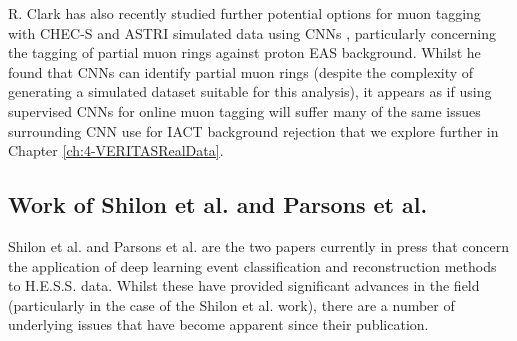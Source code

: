 R. Clark has also recently studied further potential options for muon tagging with CHEC-S and ASTRI simulated data using CNNs \cite{roganthesis}, particularly concerning the tagging of partial muon rings against proton EAS background. Whilst he found that CNNs can identify partial muon rings (despite the complexity of generating a simulated dataset suitable for this analysis), it appears as if using supervised CNNs for online muon tagging will suffer many of the same issues surrounding CNN use for IACT background rejection that we explore further in Chapter \ref{ch:4-VERITASRealData}.

\subsection{Work of Shilon et al. and Parsons et al.}
Shilon et al. \cite{Shilon} and Parsons et al. \cite{ParsonsOhm} are the two papers currently in press that concern the application of deep learning event classification and reconstruction methods to H.E.S.S. data. Whilst these have provided significant advances in the field (particularly in the case of the Shilon et al. work), there are a number of underlying issues that have become apparent since their publication.

